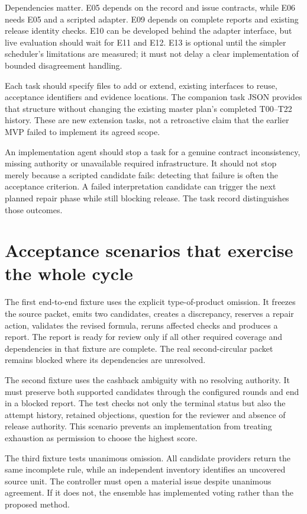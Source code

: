 \documentclass[12pt,a4paper,oneside,openany]{book}
\begin{document}
Dependencies matter. E05 depends on the record and issue contracts, while E06
needs E05 and a scripted adapter. E09 depends on complete reports and existing
release identity checks. E10 can be developed behind the adapter interface, but
live evaluation should wait for E11 and E12. E13 is optional until the simpler
scheduler's limitations are measured; it must not delay a clear implementation
of bounded disagreement handling.

Each task should specify files to add or extend, existing interfaces to reuse,
acceptance identifiers and evidence locations. The companion task JSON provides
that structure without changing the existing master plan's completed T00--T22
history. These are new extension tasks, not a retroactive claim that the earlier
MVP failed to implement its agreed scope.

An implementation agent should stop a task for a genuine contract inconsistency,
missing authority or unavailable required infrastructure. It should not stop
merely because a scripted candidate fails: detecting that failure is often the
acceptance criterion. A failed interpretation candidate can trigger the next
planned repair phase while still blocking release. The task record distinguishes
those outcomes.

\section{Acceptance scenarios that exercise the whole cycle}

The first end-to-end fixture uses the explicit type-of-product omission. It
freezes the source packet, emits two candidates, creates a discrepancy, reserves
a repair action, validates the revised formula, reruns affected checks and
produces a report. The report is ready for review only if all other required
coverage and dependencies in that fixture are complete. The real second-circular
packet remains blocked where its dependencies are unresolved.

The second fixture uses the cashback ambiguity with no resolving authority. It
must preserve both supported candidates through the configured rounds and end in
a blocked report. The test checks not only the terminal status but also the
attempt history, retained objections, question for the reviewer and absence of
release authority. This scenario prevents an implementation from treating
exhaustion as permission to choose the highest score.

The third fixture tests unanimous omission. All candidate providers return the
same incomplete rule, while an independent inventory identifies an uncovered
source unit. The controller must open a material issue despite unanimous agreement.
If it does not, the ensemble has implemented voting rather than the proposed
method.
\end{document}
